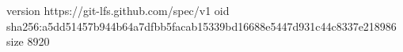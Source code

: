 version https://git-lfs.github.com/spec/v1
oid sha256:a5dd51457b944b64a7dfbb5facab15339bd16688e5447d931c44c8337e218986
size 8920
